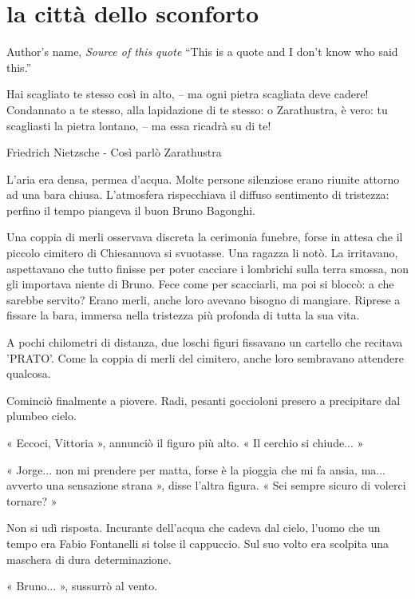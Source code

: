 \chapter{la città dello sconforto}

\begin{chapquote}{Author's name, \textit{Source of this quote}}
``This is a quote and I don't know who said this.''
\end{chapquote}


Hai scagliato te stesso così in alto, – ma ogni pietra scagliata deve cadere! Condannato a te stesso, alla lapidazione di te stesso: o Zarathustra, è vero: tu scagliasti la pietra lontano, – ma essa ricadrà su di te!

Friedrich Nietzsche - Così parlò Zarathustra


L'aria era densa, permea d'acqua. Molte persone silenziose erano riunite attorno ad una bara chiusa. L'atmosfera rispecchiava il diffuso sentimento di tristezza: perfino il tempo piangeva il buon Bruno Bagonghi.

Una coppia di merli osservava discreta la cerimonia funebre, forse in attesa che il piccolo cimitero di Chiesanuova si svuotasse. Una ragazza li notò. La irritavano, aspettavano che tutto finisse per poter cacciare i lombrichi sulla terra smossa, non gli importava niente di Bruno. Fece come per scacciarli, ma poi si bloccò: a che sarebbe servito? Erano merli, anche loro avevano bisogno di mangiare. Riprese a fissare la bara, immersa nella tristezza più profonda di tutta la sua vita.

A pochi chilometri di distanza, due loschi figuri fissavano un cartello che recitava 'PRATO'. Come la coppia di merli del cimitero, anche loro sembravano attendere qualcosa.

Cominciò finalmente a piovere. Radi, pesanti goccioloni presero a precipitare dal plumbeo cielo. 

« Eccoci, Vittoria », annunciò il figuro più alto. « Il cerchio si chiude... »

« Jorge... non mi prendere per matta, forse è la pioggia che mi fa ansia, ma... avverto una sensazione strana », disse l'altra figura. « Sei sempre sicuro di volerci tornare? »

Non si udì risposta. Incurante dell'acqua che cadeva dal cielo, l'uomo che un tempo era Fabio Fontanelli si tolse il cappuccio. Sul suo volto era scolpita una maschera di dura determinazione.

« Bruno... », sussurrò al vento.

